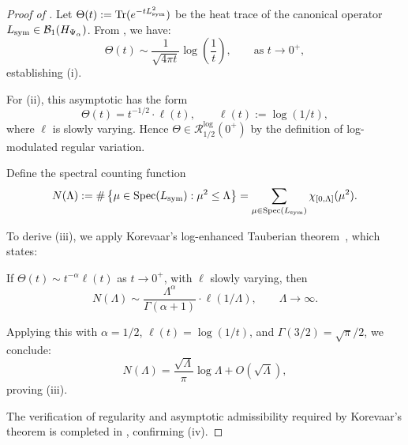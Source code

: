 \begin{proof}[Proof of ]
Let \( \Theta(t) := \operatorname{Tr}(e^{-t L_{\mathrm{sym}}^2}) \) be the heat trace of the canonical operator \( L_{\mathrm{sym}} \in \mathcal{B}_1(H_{\Psi_\alpha}) \). From , we have:
\[
\Theta(t) \sim \frac{1}{\sqrt{4\pi t}} \log\left( \frac{1}{t} \right), \qquad \text{as } t \to 0^+,
\]
establishing (i).

\medskip

For (ii), this asymptotic has the form
\[
\Theta(t) = t^{-1/2} \cdot \ell(t), \qquad \ell(t) := \log(1/t),
\]
where \( \ell \) is slowly varying. Hence \( \Theta \in \mathcal{R}^{\log}_{1/2}(0^+) \) by the definition of log-modulated regular variation.

\medskip

Define the spectral counting function
\[
N(\Lambda) := \#\left\{ \mu \in \operatorname{Spec}(L_{\mathrm{sym}}) : \mu^2 \le \Lambda \right\}
= \sum_{\mu \in \operatorname{Spec}(L_{\mathrm{sym}})} \chi_{[0, \Lambda]}(\mu^2).
\]

\medskip

To derive (iii), we apply Korevaar’s log-enhanced Tauberian theorem~\cite[Ch.~III, Thm.~5.1]{Korevaar2004Tauberian}, which states:

If \( \Theta(t) \sim t^{-\alpha} \ell(t) \) as \( t \to 0^+ \), with \( \ell \) slowly varying, then
\[
N(\Lambda) \sim \frac{\Lambda^\alpha}{\Gamma(\alpha + 1)} \cdot \ell(1/\Lambda), \qquad \Lambda \to \infty.
\]

\medskip

Applying this with \( \alpha = 1/2 \), \( \ell(t) = \log(1/t) \), and \( \Gamma(3/2) = \sqrt{\pi}/2 \), we conclude:
\[
N(\Lambda) = \frac{\sqrt{\Lambda}}{\pi} \log \Lambda + O(\sqrt{\Lambda}),
\]
proving (iii).

\medskip

The verification of regularity and asymptotic admissibility required by Korevaar’s theorem is completed in , confirming (iv).
\end{proof}
